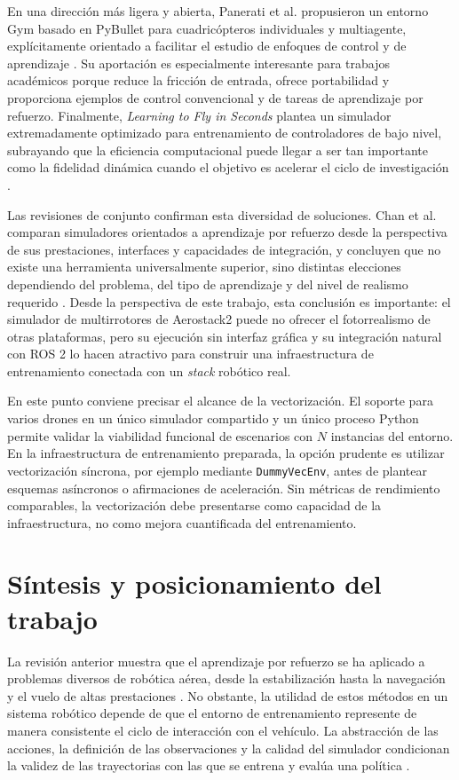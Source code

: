 En una dirección más ligera y abierta, Panerati et al. propusieron un entorno
Gym basado en PyBullet para cuadricópteros individuales y multiagente,
explícitamente orientado a facilitar el estudio de enfoques de control y de
aprendizaje \cite{panerati2021pybullet}. Su aportación es
especialmente interesante para trabajos académicos porque reduce la fricción de
entrada, ofrece portabilidad y proporciona ejemplos de control convencional y de
tareas de aprendizaje por refuerzo. Finalmente, \emph{Learning to Fly in
Seconds} plantea un simulador extremadamente optimizado para entrenamiento de
controladores de bajo nivel, subrayando que la eficiencia computacional puede
llegar a ser tan importante como la fidelidad dinámica cuando el objetivo es
acelerar el ciclo de investigación \cite{eschmann2024seconds}.

Las revisiones de conjunto confirman esta diversidad de soluciones. Chan et al.
comparan simuladores orientados a aprendizaje por refuerzo desde la perspectiva
de sus prestaciones, interfaces y capacidades de integración, y concluyen que no
existe una herramienta universalmente superior, sino distintas elecciones
dependiendo del problema, del tipo de aprendizaje y del nivel de realismo
requerido \cite{chan2024drone_simulators}. Desde la perspectiva de este trabajo,
esta conclusión es importante: el simulador de multirrotores de Aerostack2 puede
no ofrecer el fotorrealismo de otras plataformas, pero su ejecución sin
interfaz gráfica y su integración natural con ROS 2 lo hacen atractivo para
construir una infraestructura de entrenamiento conectada con un \emph{stack}
robótico real.

En este punto conviene precisar el alcance de la vectorización. El soporte para
varios drones en un único simulador compartido y un único proceso Python permite
validar la viabilidad funcional de escenarios con $N$ instancias del entorno. En
la infraestructura de entrenamiento preparada, la opción prudente es utilizar
vectorización síncrona, por ejemplo mediante \texttt{DummyVecEnv}, antes de
plantear esquemas asíncronos o afirmaciones de aceleración. Sin métricas de
rendimiento comparables, la vectorización debe presentarse como capacidad de la
infraestructura, no como mejora cuantificada del entrenamiento.

\section{Síntesis y posicionamiento del trabajo}

La revisión anterior muestra que el aprendizaje por refuerzo se ha aplicado a
problemas diversos de robótica aérea, desde la estabilización hasta la
navegación y el vuelo de altas prestaciones
\cite{kaufmann2020acrobatics, pi2021lowlevel, yoo2021hybrid, song2023racing}.
No obstante, la utilidad de estos métodos en un sistema robótico depende de que
el entorno de entrenamiento represente de manera consistente el ciclo de
interacción con el vehículo. La abstracción de las acciones, la definición de
las observaciones y la calidad del simulador condicionan la validez de las
trayectorias con las que se entrena y evalúa una política
\cite{kaufmann2022benchmark, chan2024drone_simulators}.

